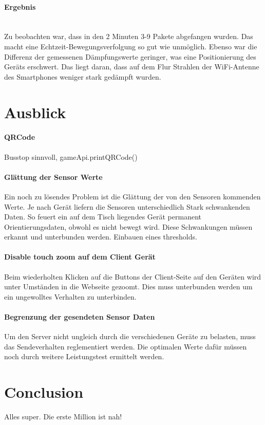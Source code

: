 \documentclass[a4paper]{spie}  %
\begin{document}
\paragraph{Ergebnis}\mbox{}\\
Zu beobachten war, dass in den 2 Minuten 3-9 Pakete abgefangen wurden. Das macht eine Echtzeit-Bewegungsverfolgung so gut wie unmöglich. Ebenso war die Differenz der gemessenen Dämpfungswerte geringer, was eine Positionierung des Geräts erschwert. Das liegt daran, dass auf dem Flur Strahlen der WiFi-Antenne des Smartphones weniger stark gedämpft wurden.

\section{Ausblick}

\paragraph{QRCode} %
    Busstop sinnvoll, gameApi.printQRCode()
\paragraph{Glättung der Sensor Werte}  %
Ein noch zu lösendes Problem ist die Glättung der von den Sensoren kommenden Werte. Je nach Gerät liefern die Sensoren unterschiedlich Stark schwankenden Daten. So feuert ein auf dem Tisch liegendes Gerät permanent Orientierungsdaten, obwohl es nicht bewegt wird. Diese Schwankungen müssen erkannt und unterbunden werden. Einbauen eines thresholds.

\paragraph{Disable touch zoom auf dem Client Gerät} %
Beim wiederholten Klicken auf die Buttons der Client-Seite auf den Geräten wird unter Umständen in die Webseite gezoomt. Dies muss unterbunden werden um ein ungewolltes Verhalten zu unterbinden.

\paragraph{Begrenzung der gesendeten Sensor Daten} %
Um den Server nicht ungleich durch die verschiedenen Geräte zu belasten, muss das Sendeverhalten reglementiert werden. Die optimalen Werte dafür müssen noch durch weitere Leistungstest ermittelt werden.


\section{Conclusion} %
Alles super. Die erste Million ist nah!





\newpage
\appendix
\end{document}
